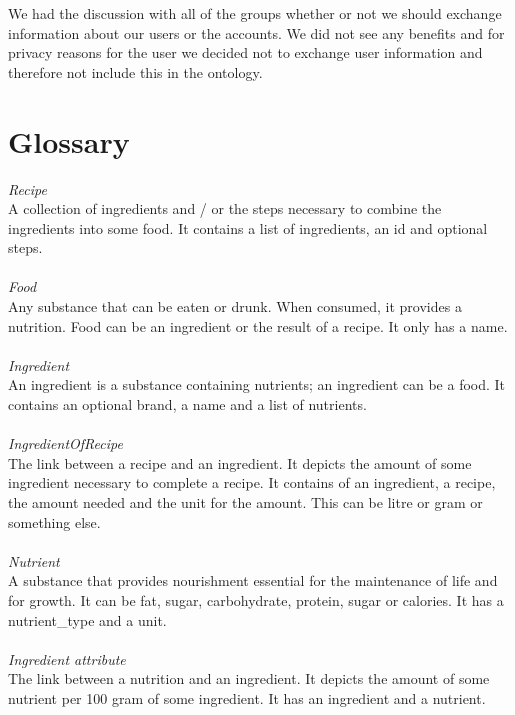 We had the discussion with all of the groups whether or not we should exchange information about our users or the accounts. We did not see any benefits and for privacy reasons for the user we decided not to exchange user information and therefore not include this in the ontology.  
\section{Glossary}
\textit{Recipe} \\
A collection of ingredients and /  or the steps necessary to combine the ingredients into some food. It contains a list of ingredients, an id and optional steps. \\ \\
\textit{Food} \\
Any substance that can be eaten or drunk. When consumed, it provides a nutrition. Food can be an ingredient or the result of a recipe. It only has a name. \\ \\
\textit{Ingredient} \\
An ingredient is a substance containing nutrients; an ingredient can be a food. It contains an optional brand, a name and a list of nutrients.  \\ \\
\textit{IngredientOfRecipe} \\
The link between a recipe and an ingredient. It depicts the amount of some ingredient necessary to complete a recipe. It contains of an ingredient, a recipe, the amount needed and the unit for the amount. This can be litre or gram or something else.\\ \\
\textit{Nutrient} \\
A substance that provides nourishment essential for the maintenance of life and for growth. It can be fat, sugar, carbohydrate, protein, sugar or calories. It has a nutrient\_type and a unit.  \\ \\
\textit{Ingredient attribute} \\
The link between a nutrition and an ingredient. It depicts the amount of some nutrient per 100 gram of some ingredient. It has an ingredient and a nutrient.\\ \\

